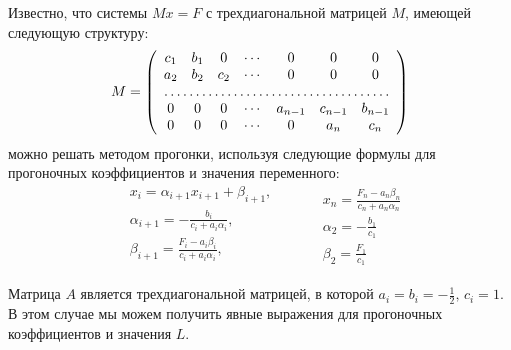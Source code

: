 Известно, что системы $ Mx = F $ с трехдиагональной матрицей $ M $, имеющей следующую структуру:
\[
M = \left(\begin{array}{ccccccc}
c_1 & b_1 & 0 & \cdots & 0 & 0 & 0 \\
a_2 & b_2 & c_2 & \cdots & 0 & 0 & 0 \\
\hdotsfor{7} \\
0 & 0 & 0 & \cdots & a_{n-1} & c_{n-1} & b_{n-1} \\
0 & 0 & 0 & \cdots & 0 & a_n & c_n
\end{array}\right)
\]
можно решать методом прогонки, используя следующие формулы для прогоночных коэффициентов и значения переменного:
\begin{equation}
\label{eq:tridiagonal:formulas}
\begin{split}
    &x_i = \alpha_{i+1} x_{i+1} + \beta_{i+1}, \\
    &\alpha_{i+1} = -\frac{b_i}{c_i + a_i\alpha_i}, \\
    &\beta_{i+1} = \frac{F_i - a_i\beta_i}{c_i + a_i\alpha_i}, \\
\end{split}
\qquad
\begin{split}
    &x_n = \frac{F_n - a_n\beta_n}{c_n + a_n\alpha_n} \\
    &\alpha_2 = -\frac{b_1}{c_1} \\
    &\beta_2 = \frac{F_1}{c_1}
\end{split}
\end{equation}

Матрица $ A $ является трехдиагональной матрицей, в которой $ a_i = b_i = -\frac{1}{2}, \, c_i = 1 $. В этом случае мы можем получить явные выражения для прогоночных коэффициентов и значения $ L $.

